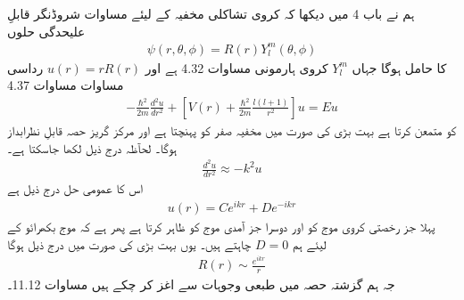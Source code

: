 ہم نے باب 4 میں دیکھا کہ کروی تشاکلی مخفیہ  کے لیئے مساوات شروڈنگر قابلِ علیحدگی حلوں
\begin{align}
	\psi(r, \theta, \phi) = R(r)Y^m_l(\theta, \phi)
\end{align}
کا حامل ہوگا جہاں \(Y_l^m\) کروی ہارمونی مساوات \num{4.32} ہے اور \(u(r) = rR(r)\) رداسی مساوات مساوات \num{4.37} 
\begin{align}
	-\frac{\hbar^2}{2m}\frac{d^2u}{dr^2}+\left[V(r)+\frac{\hbar^2}{2m}\frac{l(l+1)}{r^2}\right]u = Eu
\end{align}
کو متمعن کرتا ہے بہت بڑی  کی صورت میں مخفیہ صفر کو پہنچتا ہے اور مرکز گریز حصہ قابلِ نظرابداز ہوگا۔ لحآظہ درج ذیل لکھا جاسکتا ہے۔
\begin{align*}
	\frac{d^2u}{dr^2} \approx-k^2u
\end{align*}
اس کا عمومی حل درج ذیل ہے
\begin{align*}
	u(r) = Ce^{ikr}+De^{-ikr}
\end{align*}
پہلا جز رخصتی کروی موج کو اور دوسرا جز آمدی موج کو ظاہر کرتا ہے پھر ہے کہ موج  بکھرائو کے لیئے ہم \(D=0\) چاہتے ہیں۔ یوں بہت بڑی  کی صورت میں درج ذیل ہوگا
\begin{align*}
	R(r)\sim\frac{e^{ikr}}{r}
\end{align*}
جہ ہم گزشتہ حصہ میں طبعی وجوہات سے اغز کر چکے ہیں مساوات  \num{11.12}۔

